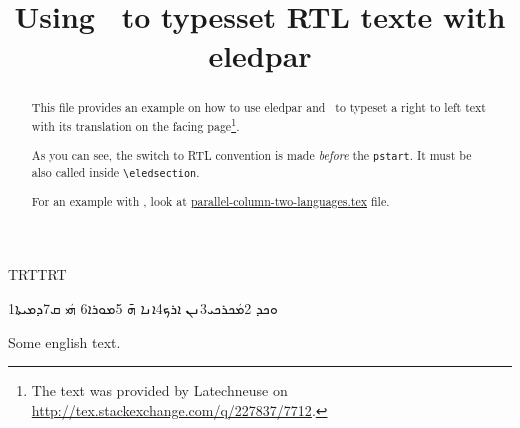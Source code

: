 \documentclass{article}
\newcommand{\textsyriac}[1] %
           {\bgroup\luatextextdir TRT\syriacfont #1\egroup}
\newenvironment{syriac}     %
           {\luatextextdir TRT\luatexpardir TRT\syriacfont}{}
\begin{document}
\date{}
\title{Using \LuaLaTeX\ to typesset RTL texte with eledpar}
\maketitle
\begin{abstract}
This file provides an example on how to use  eledpar and \LuaLaTeX\ to typeset a right to left text with its translation on the facing page\footnote{The text was provided by Latechneuse on \url{http://tex.stackexchange.com/q/227837/7712}.}.  

As you can see, the switch to RTL convention is made \emph{before} the \verb+pstart+.
It must be also called inside \verb+\eledsection+.

For an example with \XeLaTeX, look at \href{./parallel-column-two-languages.tex}{parallel-column-two-languages.tex} file.
\end{abstract}
\begin{pages}
\begin{Leftside}
\begin{syriac}
\beginnumbering
   \pstart 
       \eledsection*{\textsyriac{ܡܿܟܪܟܝ}}
   \pend

   \pstart
        1ܘܟܕ 2ܡܿܟܪܟܝ3ܢܢ ܐܪܟ4ܐܢܐ ܗ̄ 5ܡܘܪܐ6 ܗܿܝ ܩ7ܕܡܝܬܐ
   \pend
\endnumbering
\end{syriac}
\end{Leftside}

\begin{Rightside}
\beginnumbering
   \pstart
   \pend

   \pstart
        Some english text. 
   \pend
\endnumbering
\end{Rightside}

\Pages
\end{pages} 
\end{document}
